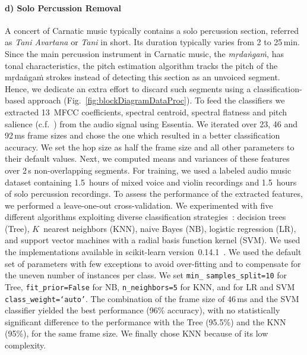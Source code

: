 \paragraph{d) Solo Percussion Removal} A concert of Carnatic music typically contains a solo percussion section, referred as {\it Tani Avartana} or {\it Tani} in short. Its duration typically varies from 2 to 25\,min. Since the main percussion instrument in Carnatic music, the {\it m\d{r}da\.{n}ga\.{m}}, has tonal characteristics, the pitch estimation algorithm tracks the pitch of the m\d{r}da\.{n}ga\.{m} strokes instead of detecting this section as an unvoiced segment. Hence, we dedicate an extra effort to discard such segments using a classification-based approach (Fig.~\ref{fig:blockDiagramDataProc}). To feed the classifiers we extracted 13~MFCC coefficients, spectral centroid, spectral flatness and pitch salience (c.f.~\cite{slaney1998auditory}) from the audio signal using Essentia. We iterated over 23, 46 and 92\,ms frame sizes and chose the one which resulted in a better classification accuracy. We set the hop size as half the frame size and all other parameters to their default values. Next, we computed means and variances of these features over 2\,s non-overlapping segments. For training, we used a labeled audio music dataset containing 1.5~hours of mixed voice and violin recordings and 1.5~hours of solo percussion recordings. To assess the performance of the extracted features, we performed a leave-one-out cross-validation. We experimented with five different algorithms exploiting diverse classification strategies~\cite{Hastie09BOOK}: decision trees (Tree), $K$~nearest neighbors (KNN), naive Bayes (NB), logistic regression (LR), and support vector machines with a radial basis function kernel (SVM). We used the implementations available in scikit-learn version~0.14.1~\cite{scikitlearn}. We used the default set of parameters with few exceptions to avoid over-fitting and to compensate for the uneven number of instances per class. We set \texttt{min\_} \texttt{samples\_split=10} for Tree, \texttt{fit\_prior=False} for NB, \texttt{n\_neighbors=5} for KNN, and for LR and SVM \texttt{class\_weight=`auto'}. The combination of the frame size of 46\,ms and the SVM classifier yielded the best performance (96\% accuracy), with no statistically significant difference to the performance with the Tree (95.5\%) and the KNN (95\%), for the same frame size. We finally chose KNN because of its low complexity.



